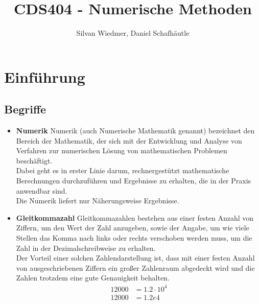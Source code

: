 \documentclass [final]{article}
\theoremstyle{definition}
\begin{document}
\title {CDS404 - Numerische Methoden}
\author {Silvan Wiedmer, Daniel Schafhäutle}
\maketitle

\tableofcontents


\section {Einführung}
\subsection{Begriffe}
\begin{itemize}
	\item {\bfseries Numerik} \linebreak
	Numerik (auch Numerische Mathematik genannt) bezeichnet den Bereich der Mathematik, der sich mit der Entwicklung und Analyse von Verfahren zur numerischen Lösung von mathematischen Problemen beschäftigt. \\
	Dabei geht es in erster Linie darum, rechnergestützt mathematische Berechnungen durchzuführen und Ergebnisse zu erhalten, die in der Praxis anwendbar sind. \\
	Die Numerik liefert nur Näherungsweise Ergebnisse.
	\item {\bfseries Gleitkommazahl} \linebreak
	Gleitkommazahlen bestehen aus einer festen Anzahl von Ziffern, um den Wert der Zahl anzugeben, sowie der Angabe, um wie viele Stellen das Komma nach links oder rechts verschoben werden muss, um die Zahl in der Dezimalschreibweise zu erhalten. \\
	Der Vorteil einer solchen Zahlendarstellung ist, dass mit einer festen Anzahl von ausgeschriebenen Ziffern ein großer Zahlenraum abgedeckt wird und die Zahlen trotzdem eine gute Genauigkeit behalten.\\

	\begin{align*}
	12000  &=  1.2\cdot10^4 \\
	12000 &=  1.2e4
	\end{align*}


\end{itemize}
\end{document}
